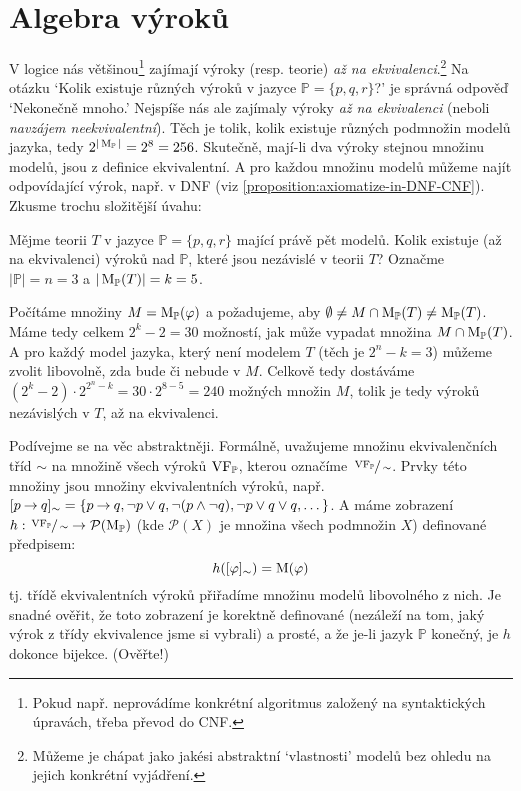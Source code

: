 \section{Algebra výroků}

V logice nás většinou\footnote{Pokud např. neprovádíme konkrétní algoritmus založený na syntaktických úpravách, třeba převod do CNF.} zajímají výroky (resp. teorie) \emph{až na ekvivalenci}.\footnote{Můžeme je chápat jako jakési abstraktní `vlastnosti' modelů bez ohledu na jejich konkrétní vyjádření.} Na otázku `Kolik existuje různých výroků v jazyce $\mathbb P=\{p,q,r\}$?' je správná odpověď `Nekonečně mnoho.' Nejspíše nás ale zajímaly výroky \emph{až na ekvivalenci} (neboli \emph{navzájem neekvivalentní}). Těch je tolik, kolik existuje různých podmnožin modelů jazyka, tedy $2^{|\operatorname{M}_\mathbb P|}=2^8=256$. Skutečně, mají-li dva výroky stejnou množinu modelů, jsou z definice ekvivalentní. A pro každou množinu modelů můžeme najít odpovídající výrok, např. v DNF (viz \ref{proposition:axiomatize-in-DNF-CNF}). Zkusme trochu složitější úvahu:

\begin{example}
    Mějme teorii $T$ v jazyce $\mathbb P=\{p,q,r\}$ mající právě pět modelů. Kolik existuje (až na ekvivalenci) výroků nad $\mathbb P$, které jsou nezávislé v teorii $T$? Označme $|\mathbb P|=n=3$ a $|\operatorname{M}_\mathbb P(T)|=k=5$.

    Počítáme množiny $M=\operatorname{M}_\mathbb P(\varphi)$ a požadujeme, aby $\emptyset\neq M\cap \operatorname{M}_\mathbb P(T)\neq\operatorname{M}_\mathbb P(T)$. Máme tedy celkem $2^k-2=30$ možností, jak může vypadat množina $M\cap \operatorname{M}_\mathbb P(T)$. A pro každý model jazyka, který není modelem $T$ (těch je $2^n-k=3$) můžeme zvolit libovolně, zda bude či nebude v $M$. Celkově tedy dostáváme $(2^k-2)\cdot 2^{2^n-k}=30\cdot 2^{8-5}=240$ možných množin $M$, tolik je tedy výroků nezávislých v $T$, až na ekvivalenci.
\end{example}

Podívejme se na věc abstraktněji. Formálně, uvažujeme množinu ekvivalenčních tříd $\sim$ na množině všech výroků $\operatorname{VF}_\mathbb P$, kterou označíme $\sfrac{\operatorname{VF}_\mathbb P}{\sim}$. Prvky této množiny jsou množiny ekvivalentních výroků, např. $[p\mathbin{\rightarrow} q]_\sim=\{p\mathbin{\rightarrow} q,\neg p \lor q,\neg(p\land \neg q), \neg p\lor q\lor q,\dots\}$. A máme zobrazení $h:\sfrac{\operatorname{VF}_\mathbb P}{\sim}\to\mathcal P(\operatorname{M}_\mathbb P)$ (kde $\mathcal P(X)$ je množina všech podmnožin $X$) definované předpisem:
$$
h([\varphi]_\sim)=\operatorname{M}(\varphi)
$$
tj. třídě ekvivalentních výroků přiřadíme množinu modelů libovolného z nich. Je snadné ověřit, že toto zobrazení je korektně definované (nezáleží na tom, jaký výrok z třídy ekvivalence jsme si vybrali) a prosté, a že je-li jazyk $\mathbb P$ konečný, je $h$ dokonce bijekce. (Ověřte!)

